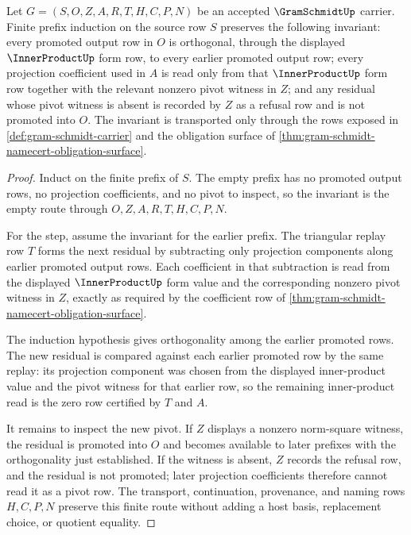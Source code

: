 \begin{theorem}
\label{thm:gram-schmidt-projection-orthogonality-induction}
Let $G=(S,O,Z,A,R,T,H,C,P,N)$ be an accepted $\GramSchmidtUp$ carrier. Finite prefix induction on the source row $S$ preserves the following invariant: every promoted output row in $O$ is orthogonal, through the displayed $\InnerProductUp$ form row, to every earlier promoted output row; every projection coefficient used in $A$ is read only from that $\InnerProductUp$ form row together with the relevant nonzero pivot witness in $Z$; and any residual whose pivot witness is absent is recorded by $Z$ as a refusal row and is not promoted into $O$. The invariant is transported only through the rows exposed in \autoref{def:gram-schmidt-carrier} and the obligation surface of \autoref{thm:gram-schmidt-namecert-obligation-surface}.
\end{theorem}
\begin{proof}
Induct on the finite prefix of $S$. The empty prefix has no promoted output rows, no projection coefficients, and no pivot to inspect, so the invariant is the empty route through $O,Z,A,R,T,H,C,P,N$.

For the step, assume the invariant for the earlier prefix. The triangular replay row $T$ forms the next residual by subtracting only projection components along earlier promoted output rows. Each coefficient in that subtraction is read from the displayed $\InnerProductUp$ form value and the corresponding nonzero pivot witness in $Z$, exactly as required by the coefficient row of \autoref{thm:gram-schmidt-namecert-obligation-surface}.

The induction hypothesis gives orthogonality among the earlier promoted rows. The new residual is compared against each earlier promoted row by the same replay: its projection component was chosen from the displayed inner-product value and the pivot witness for that earlier row, so the remaining inner-product read is the zero row certified by $T$ and $A$.

It remains to inspect the new pivot. If $Z$ displays a nonzero norm-square witness, the residual is promoted into $O$ and becomes available to later prefixes with the orthogonality just established. If the witness is absent, $Z$ records the refusal row, and the residual is not promoted; later projection coefficients therefore cannot read it as a pivot row. The transport, continuation, provenance, and naming rows $H,C,P,N$ preserve this finite route without adding a host basis, replacement choice, or quotient equality.
\end{proof}

